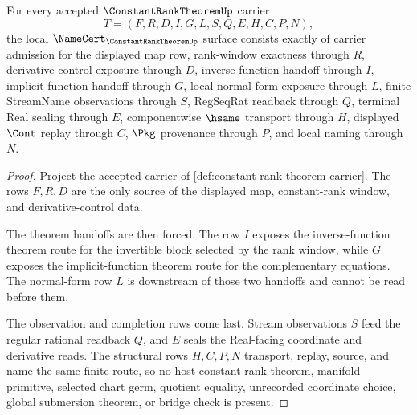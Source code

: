 \begin{theorem}
\label{thm:constant-rank-theorem-namecert-obligations}
For every accepted $\ConstantRankTheoremUp$ carrier
$$
T=(F,R,D,I,G,L,S,Q,E,H,C,P,N),
$$
the local $\NameCert_{\ConstantRankTheoremUp}$ surface consists exactly of carrier admission for the displayed map row, rank-window exactness through $R$, derivative-control exposure through $D$, inverse-function handoff through $I$, implicit-function handoff through $G$, local normal-form exposure through $L$, finite StreamName observations through $S$, RegSeqRat readback through $Q$, terminal Real sealing through $E$, componentwise $\hsame$ transport through $H$, displayed $\Cont$ replay through $C$, $\Pkg$ provenance through $P$, and local naming through $N$.
\end{theorem}
\begin{proof}
Project the accepted carrier of \autoref{def:constant-rank-theorem-carrier}. The rows $F,R,D$ are the only source of the displayed map, constant-rank window, and derivative-control data.

The theorem handoffs are then forced. The row $I$ exposes the inverse-function theorem route for the invertible block selected by the rank window, while $G$ exposes the implicit-function theorem route for the complementary equations. The normal-form row $L$ is downstream of those two handoffs and cannot be read before them.

The observation and completion rows come last. Stream observations $S$ feed the regular rational readback $Q$, and $E$ seals the Real-facing coordinate and derivative reads. The structural rows $H,C,P,N$ transport, replay, source, and name the same finite route, so no host constant-rank theorem, manifold primitive, selected chart germ, quotient equality, unrecorded coordinate choice, global submersion theorem, or bridge check is present.
\end{proof}

